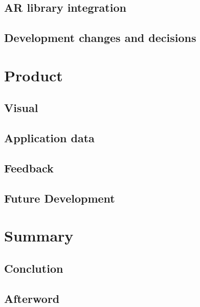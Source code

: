 \documentclass[BSP,english,oneside]{classes/gucthesis}
\begin{document}
	\chapter{AR library integration}
		\label{chap:AR_library_integration}
		

	\chapter{Development changes and decisions}
		\label{chap:Developmentchangesanddecisions}
		


\part{Product}

	\chapter{Visual}
		\label{chap:visual}
		

	\chapter{Application data}
		\label{chap:application_data}
		

	\chapter{Feedback}
		\label{chap:feedback}
		

	\chapter{Future Development}
		\label{chap:future_development}
		


\part{Summary}

	\chapter{Conclution}
		\label{chap:conclution}
		

	\chapter{Afterword}
		\label{chap:afterword}
		
\end{document}
